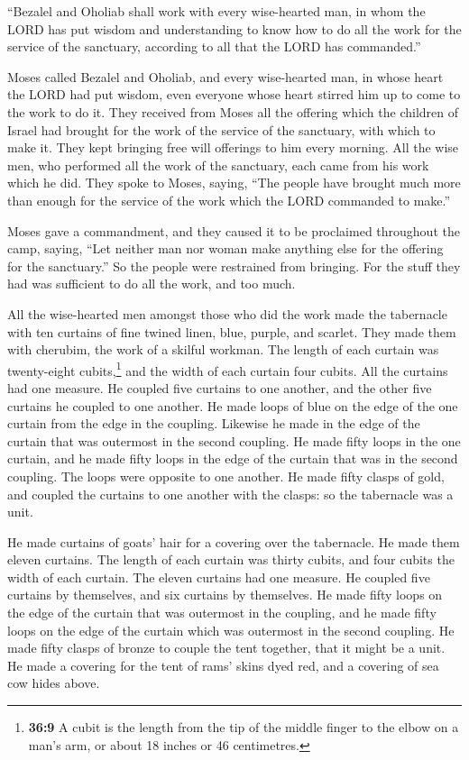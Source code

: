  ``Bezalel and Oholiab shall work with every wise-hearted
man, in whom the LORD has put wisdom and understanding to know how to do
all the work for the service of the sanctuary, according to all that the
LORD has commanded.''

 Moses called Bezalel and Oholiab, and every wise-hearted
man, in whose heart the LORD had put wisdom, even everyone whose heart
stirred him up to come to the work to do it.  They
received from Moses all the offering which the children of Israel had
brought for the work of the service of the sanctuary, with which to make
it. They kept bringing free will offerings to him every morning.
 All the wise men, who performed all the work of the
sanctuary, each came from his work which he did.  They
spoke to Moses, saying, ``The people have brought much more than enough
for the service of the work which the LORD commanded to make.''

 Moses gave a commandment, and they caused it to be
proclaimed throughout the camp, saying, ``Let neither man nor woman make
anything else for the offering for the sanctuary.'' So the people were
restrained from bringing.  For the stuff they had was
sufficient to do all the work, and too much.

 All the wise-hearted men amongst those who did the work
made the tabernacle with ten curtains of fine twined linen, blue,
purple, and scarlet. They made them with cherubim, the work of a skilful
workman.  The length of each curtain was twenty-eight
cubits,\footnote{\textbf{36:9} A cubit is the length from the tip of the
  middle finger to the elbow on a man's arm, or about 18 inches or 46
  centimetres.} and the width of each curtain four cubits. All the
curtains had one measure.  He coupled five curtains to
one another, and the other five curtains he coupled to one another.
 He made loops of blue on the edge of the one curtain
from the edge in the coupling. Likewise he made in the edge of the
curtain that was outermost in the second coupling.  He
made fifty loops in the one curtain, and he made fifty loops in the edge
of the curtain that was in the second coupling. The loops were opposite
to one another.  He made fifty clasps of gold, and
coupled the curtains to one another with the clasps: so the tabernacle
was a unit.

 He made curtains of goats' hair for a covering over the
tabernacle. He made them eleven curtains.  The length of
each curtain was thirty cubits, and four cubits the width of each
curtain. The eleven curtains had one measure.  He coupled
five curtains by themselves, and six curtains by themselves.
 He made fifty loops on the edge of the curtain that was
outermost in the coupling, and he made fifty loops on the edge of the
curtain which was outermost in the second coupling.  He
made fifty clasps of bronze to couple the tent together, that it might
be a unit.  He made a covering for the tent of rams'
skins dyed red, and a covering of sea cow hides above.

